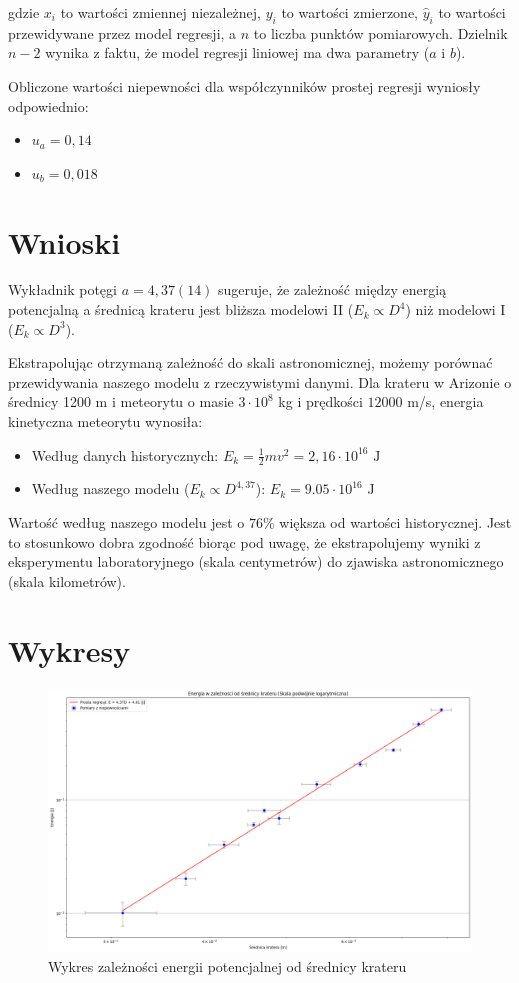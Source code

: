 \documentclass[a4paper,12pt]{article}
\begin{document}
gdzie $x_i$ to wartości zmiennej niezależnej, $y_i$ to wartości zmierzone, $\hat{y}_i$ to wartości przewidywane przez model regresji, a $n$ to liczba punktów pomiarowych. Dzielnik $n-2$ wynika z faktu, że model regresji liniowej ma dwa parametry ($a$ i $b$).


Obliczone wartości niepewności dla współczynników prostej regresji wyniosły odpowiednio:

\begin{itemize}
    \item $u_a = 0,14$
    \item $u_b = 0,018$
\end{itemize}

\newpage

\section{Wnioski}

Wykładnik potęgi $a = 4,37(14)$ sugeruje, że zależność między energią potencjalną a średnicą krateru jest bliższa modelowi II ($E_k \propto D^4$) niż modelowi I ($E_k \propto D^3$).

Ekstrapolując otrzymaną zależność do skali astronomicznej, możemy porównać przewidywania naszego modelu z rzeczywistymi danymi. Dla krateru w Arizonie o średnicy 1200 m i meteorytu o masie $3\cdot10^8$ kg i prędkości $12000$ m/s, energia kinetyczna meteorytu wynosiła:

\begin{itemize}
    \item Według danych historycznych: $E_k = \frac{1}{2}mv^2 = 2,16\cdot10^{16} \text{ J}$
    \item Według naszego modelu ($E_k \propto D^{4,37}$): $E_k = 9.05\cdot10^{16} \text{ J}$
\end{itemize}

Wartość według naszego modelu jest o $76\%$ większa od wartości historycznej. Jest to stosunkowo dobra zgodność biorąc pod uwagę, że ekstrapolujemy wyniki z eksperymentu laboratoryjnego (skala centymetrów) do zjawiska astronomicznego (skala kilometrów).


\section{Wykresy}

\begin{figure}[H]
    \centering
    \includegraphics[angle=90,height=0.90\textheight]{energia_od_srednicy.png}
    \caption{Wykres zależności energii potencjalnej od średnicy krateru}
    \label{rys:energia_od_srednicy}
\end{figure}

% 
% 
\end{document}
